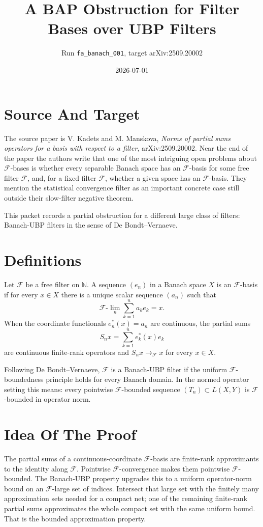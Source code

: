 \documentclass[11pt]{article}
\title{A BAP Obstruction for Filter Bases over UBP Filters}
\author{Run \texttt{fa\_banach\_001}, target arXiv:2509.20002}
\date{2026-07-01}
\newcommand{\F}{\mathcal F}
\newcommand{\N}{\mathbb N}
\begin{document}
\maketitle

\section*{Source And Target}

The source paper is V. Kadets and M. Manskova,
\emph{Norms of partial sums operators for a basis with respect to a filter},
arXiv:2509.20002.  Near the end of the paper the authors write that one of the
most intriguing open problems about $\F$-bases is whether every separable Banach
space has an $\F$-basis for some free filter $\F$, and, for a fixed filter
$\F$, whether a given space has an $\F$-basis.  They mention the statistical
convergence filter as an important concrete case still outside their slow-filter
negative theorem.

This packet records a partial obstruction for a different large class of
filters: Banach-UBP filters in the sense of De Bondt--Vernaeve.

\section*{Definitions}

Let $\F$ be a free filter on $\N$.  A sequence $(e_n)$ in a Banach space $X$ is
an $\F$-basis if for every $x\in X$ there is a unique scalar sequence
$(a_n)$ such that
\[
  \F\text{-}\lim_n \sum_{k=1}^n a_k e_k = x.
\]
When the coordinate functionals $e_n^*(x)=a_n$ are continuous, the partial sums
\[
  S_nx=\sum_{k=1}^n e_k^*(x)e_k
\]
are continuous finite-rank operators and $S_nx\to_\F x$ for every $x\in X$.

Following De Bondt--Vernaeve, $\F$ is a Banach-UBP filter if the uniform
$\F$-boundedness principle holds for every Banach domain.  In the normed
operator setting this means: every pointwise $\F$-bounded sequence
$(T_n)\subset L(X,Y)$ is $\F$-bounded in operator norm.

\section*{Idea Of The Proof}

The partial sums of a continuous-coordinate $\F$-basis are finite-rank
approximants to the identity along $\F$.  Pointwise $\F$-convergence makes them
pointwise $\F$-bounded.  The Banach-UBP property upgrades this to a uniform
operator-norm bound on an $\F$-large set of indices.  Intersect that large set
with the finitely many approximation sets needed for a compact net; one of the
remaining finite-rank partial sums approximates the whole compact set with the
same uniform bound.  That is the bounded approximation property.
\end{document}
